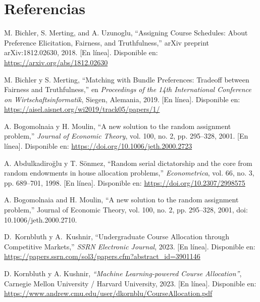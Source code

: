 \documentclass{article}
\begin{document}
\section{Referencias}
\renewcommand{\refname}{}
\begin{thebibliography}{9}

 \label{ref:BPS} M. Bichler, S. Merting, and A. Uzunoglu, 
“Assigning Course Schedules: About Preference Elicitation, Fairness, and Truthfulness,” 
arXiv preprint arXiv:1812.02630, 2018. [En línea]. Disponible en: 
\url{https://arxiv.org/abs/1812.02630}

 \label{ref:MatchingBundle}
M. Bichler y S. Merting, ``Matching with Bundle Preferences: Tradeoff between Fairness 
and Truthfulness,'' en \textit{Proceedings of the 14th International Conference on 
Wirtschaftsinformatik}, Siegen, Alemania, 2019. [En línea]. Disponible en: 
\url{https://aisel.aisnet.org/wi2019/track05/papers/1/}

 \label{ref:RSD1} 
A. Bogomolnaia y H. Moulin, 
“A new solution to the random assignment problem,” 
\textit{Journal of Economic Theory}, vol. 100, no. 2, pp. 295–328, 2001. [En línea]. Disponible en: \url{https://doi.org/10.1006/jeth.2000.2723}

 \label{ref:RSD2} 
A. Abdulkadiroğlu y T. Sönmez, 
“Random serial dictatorship and the core from random endowments in house allocation problems,” 
\textit{Econometrica}, vol. 66, no. 3, pp. 689–701, 1998. [En línea]. Disponible en: \url{https://doi.org/10.2307/2998575}

 \label{ref:PBS} A. Bogomolnaia and H. Moulin, “A new solution to the random 
assignment problem,” Journal of Economic Theory, vol. 100, no. 2, pp. 295–328, 2001, doi: 
10.1006/jeth.2000.2710.

 \label{ref:Mercados}
D.~Kornbluth y A.~Kushnir, ``Undergraduate Course Allocation through Competitive Markets,'' \textit{SSRN Electronic Journal}, 2023. [En línea]. Disponible en: \url{https://papers.ssrn.com/sol3/papers.cfm?abstract_id=3901146}

 \label{ref:AprendizajeAutomatico} 
D. Kornbluth y A. Kushnir, 
\textit{“Machine Learning-powered Course Allocation”}, 
Carnegie Mellon University / Harvard University, 2023. [En línea]. Disponible en: \url{https://www.andrew.cmu.edu/user/dkornblu/CourseAllocation.pdf}


\end{thebibliography}
\end{document}
